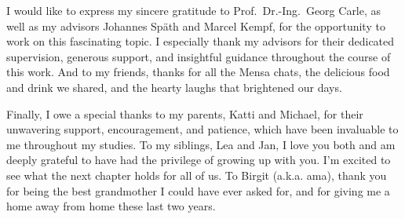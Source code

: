 I would like to express my sincere gratitude to Prof.~Dr.-Ing.~Georg Carle, as well as my advisors Johannes Späth and Marcel Kempf, for the opportunity to work on this fascinating topic. I especially thank my advisors for their dedicated supervision, generous support, and insightful guidance throughout the course of this work. And to my friends, thanks for all the Mensa chats, the delicious food and drink we shared, and the hearty laughs that brightened our days.

Finally, I owe a special thanks to my parents, Katti and Michael, for their unwavering support, encouragement, and patience, which have been invaluable to me throughout my studies. To my siblings, Lea and Jan, I love you both and am deeply grateful to have had the privilege of growing up with you. I'm excited to see what the next chapter holds for all of us. To Birgit (a.k.a. ama), thank you for being the best grandmother I could have ever asked for, and for giving me a home away from home these last two years.
